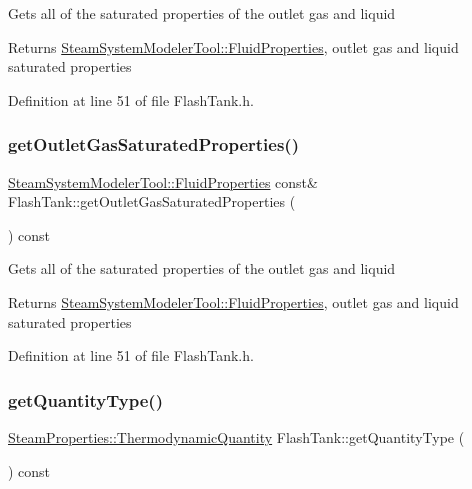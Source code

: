 Gets all of the saturated properties of the outlet gas and liquid \begin{DoxyReturn}{Returns}
\hyperlink{struct_steam_system_modeler_tool_1_1_fluid_properties}{Steam\+System\+Modeler\+Tool\+::\+Fluid\+Properties}, outlet gas and liquid saturated properties 
\end{DoxyReturn}


Definition at line 51 of file Flash\+Tank.\+h.

\mbox{\label{class_flash_tank_a9db00130ed4419e2e251c9e5ce936572}} 
\subsubsection{\texorpdfstring{get\+Outlet\+Gas\+Saturated\+Properties()}{getOutletGasSaturatedProperties()}\hspace{0.1cm}{\footnotesize\ttfamily [3/3]}}
{\footnotesize\ttfamily \hyperlink{struct_steam_system_modeler_tool_1_1_fluid_properties}{Steam\+System\+Modeler\+Tool\+::\+Fluid\+Properties} const\& Flash\+Tank\+::get\+Outlet\+Gas\+Saturated\+Properties (\begin{DoxyParamCaption}{ }\end{DoxyParamCaption}) const\hspace{0.3cm}{\ttfamily [inline]}}

Gets all of the saturated properties of the outlet gas and liquid \begin{DoxyReturn}{Returns}
\hyperlink{struct_steam_system_modeler_tool_1_1_fluid_properties}{Steam\+System\+Modeler\+Tool\+::\+Fluid\+Properties}, outlet gas and liquid saturated properties 
\end{DoxyReturn}


Definition at line 51 of file Flash\+Tank.\+h.

\mbox{\label{class_flash_tank_a1800317a9b9dd8ff8fb18c693e846a45}} 
\subsubsection{\texorpdfstring{get\+Quantity\+Type()}{getQuantityType()}\hspace{0.1cm}{\footnotesize\ttfamily [1/3]}}
{\footnotesize\ttfamily \hyperlink{class_steam_properties_ae0294bedf7d178c2d8fb6aed0f62fbff}{Steam\+Properties\+::\+Thermodynamic\+Quantity} Flash\+Tank\+::get\+Quantity\+Type (\begin{DoxyParamCaption}{ }\end{DoxyParamCaption}) const}

